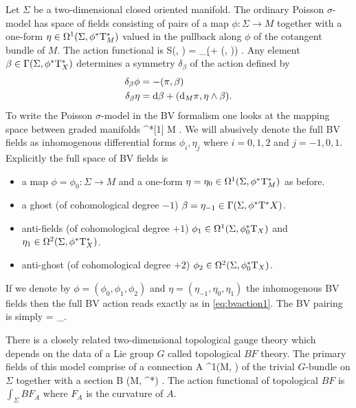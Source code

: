 \documentclass[../main.tex]{subfiles}
\begin{document}
Let $\Sigma$ be a two-dimensional closed oriented manifold.
The ordinary Poisson $\sigma$-model has space of fields consisting of pairs of a map $\phi \colon \Sigma \to M$ together with a one-form $\eta \in \Omega^1(\Sigma, \phi^* {\rm T}_M^*)$ valued in the pullback along $\phi$ of the cotangent bundle of $M$.
The action functional \cite{CF_psm,Strobl,Ikeda} is
\beqn
\label{eq:bvaction1}
S(\phi, \eta) = \int_\Sigma \left(\eta \d \phi +  (\pi, \eta \wedge \eta)\right) .
\eeqn
Any element $\beta \in \Gamma(\Sigma, \phi^*{\rm T}^*_X)$ determines a symmetry $\delta_\beta$ of the action defined by
\begin{align*}
\delta_\beta \phi & = - (\pi, \beta) \\
\delta_\beta \eta & = {\rm d} \beta + ({\rm d}_M \pi, \eta \wedge \beta) .
\end{align*}
To write the Poisson $\sigma$-model in the BV formalism one looks at the mapping space between graded manifolds
\beqn
\T[1]\Sigma \to \T^*[1] M .
\eeqn
We will abusively denote the full BV fields as inhomogenous differential forms $\phi_i, \eta_j$ where $i=0,1,2$ and $j=-1,0,1$.
Explicitly the full space of BV fields is
\begin{itemize}
\item a map $\phi = \phi_0 \colon \Sigma \to M$ and a one-form $\eta = \eta_0 \in \Omega^1(\Sigma, \phi^* {\rm T}_M^*)$ as before.
\item a ghost (of cohomological degree $-1$) $\beta = \eta_{-1} \in \Gamma(\Sigma, \phi^*{\rm T}^*X)$.
\item anti-fields (of cohomological degree $+1$) $\phi_1 \in \Omega^1(\Sigma, \phi_0^*{\rm T}_X)$ and $\eta_1 \in \Omega^2(\Sigma, \phi^*{\rm T}^*_X)$.
\item anti-ghost (of cohomological degree $+2$) $\phi_2 \in \Omega^2(\Sigma, \phi_0^*{\rm T}_X)$.
\end{itemize}
If we denote by $\phi = (\phi_0,\phi_1,\phi_2)$ and $\eta = (\eta_{-1},\eta_0,\eta_1)$ the inhomogenous BV fields then the full BV action reads exactly as in \eqref{eq:bvaction1}.
The BV pairing is simply
\beqn
\omega = \int_\Sigma \delta \phi \wedge \delta \eta .
\eeqn

There is a closely related two-dimensional topological gauge theory which depends on the data of a Lie group $G$ called topological $BF$ theory.
The primary fields of this model comprise of a connection 
\beqn
A \in \Omega^1(M, )
\eeqn
of the trivial $G$-bundle on $\Sigma$ together with a section
\beqn
B \in \Gamma(M, ^*) .
\eeqn
The action functional of topological $BF$ is $\int_{\Sigma} B F_A$ where $F_A$ is the curvature of $A$.
\end{document}
